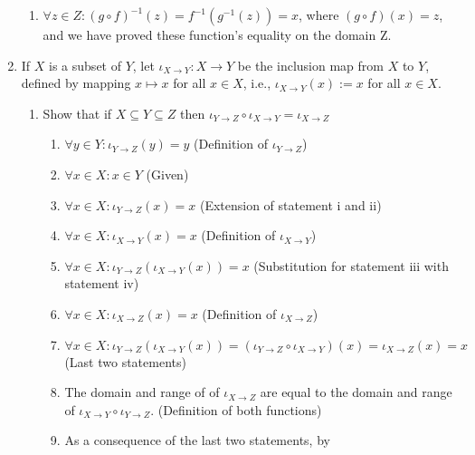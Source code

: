 \documentclass{article}
\begin{document}
\begin{enumerate}
\begin{enumerate}
                \item $\forall z \in Z: {(g \circ f)}^{-1}(z) = f^{-1}(g^{-1}(z)) = x$, where $(g \circ f)(x) = z$, and we have proved these function's equality on the domain Z.
            \end{enumerate}
        \item If $X$ is a subset of $Y$, let ${\iota}_{X \rightarrow Y}: X
            \rightarrow Y$ be the inclusion map from $X$ to $Y$, defined by
            mapping $x \mapsto x$ for all $x \in X$, i.e., ${\iota}_{X
            \rightarrow Y}(x) := x$ for all $x \in X$.
            \begin{enumerate}
                \item Show that if $X \subseteq Y \subseteq Z$ then ${\iota}_{Y
                    \rightarrow Z} \circ {\iota}_{X \rightarrow Y} = {\iota}_{X
                    \rightarrow Z}$
                    \begin{enumerate}
                        \item $\forall y \in Y: {\iota}_{Y \rightarrow Z}(y) = y$ (Definition of ${\iota}_{Y \rightarrow Z}$)
                        \item $\forall x \in X: x \in Y$ (Given)
                        \item $\forall x \in X: {\iota}_{Y \rightarrow Z}(x) = x$ (Extension of statement i and ii)
                        \item $\forall x \in X: {\iota}_{X \rightarrow Y}(x) = x$ (Definition of ${\iota}_{X \rightarrow Y}$)
                        \item $\forall x \in X: {\iota}_{Y \rightarrow Z}({\iota}_{X \rightarrow Y}(x)) = x$ (Substitution for statement iii with statement iv)
                        \item $\forall x \in X: {\iota}_{X \rightarrow Z}(x) = x$ (Definition of ${\iota}_{X \rightarrow Z}$)
                        \item $\forall x \in X: {\iota}_{Y \rightarrow
                            Z}({\iota}_{X \rightarrow Y}(x)) =  ({\iota}_{Y
                            \rightarrow Z} \circ {\iota}_{X \rightarrow Y})(x) =
                            {\iota}_{X \rightarrow Z}(x) = x$ (Last two statements)
                        \item The domain and range of of ${\iota}_{X \rightarrow Z}$ are equal to the domain and range of ${\iota}_{X \rightarrow Y} \circ {\iota}_{Y \rightarrow Z}$. (Definition of both functions)
                        \item As a consequence of the last two statements, by

\end{enumerate}
\end{enumerate}
\end{enumerate}
\end{document}

